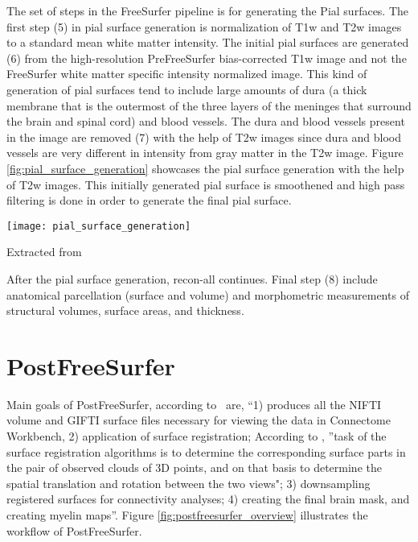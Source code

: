 The set of steps in the FreeSurfer pipeline is for generating the Pial surfaces. The first step (5) in pial surface generation is normalization of T1w and T2w images to a standard mean white matter intensity. The initial pial surfaces are generated (6) from the high-resolution PreFreeSurfer bias-corrected T1w image and not the FreeSurfer white matter specific intensity normalized image. This kind of generation of pial surfaces tend to include large amounts of dura (a thick membrane that is the outermost of the three layers of the meninges that surround the brain and spinal cord) and blood vessels. The dura and blood vessels present in the image are removed (7) with the help of T2w images since dura and blood vessels are very different in intensity from gray matter in the T2w image. Figure \ref{fig:pial_surface_generation} showcases the pial surface generation with the help of T2w images. This initially generated pial surface is smoothened and high pass filtering is done in order to generate the final pial surface.

\begin{center}
  \texttt{[image: pial\_surface\_generation]}
  \label{fig:pial_surface_generation}
  \caption*{Extracted from \cite{Gla13}}
\end{center}

After the pial surface generation, recon-all continues. Final step (8) include anatomical parcellation (surface and volume) and morphometric measurements of structural volumes, surface areas, and thickness.

\section{PostFreeSurfer} \label{sec:PostFreeSurfer}
Main goals of PostFreeSurfer, according to~\cite{Gla13} are, ``1) produces all the NIFTI volume and GIFTI surface files necessary for viewing the data in Connectome Workbench, 2) application of surface registration; According to \cite{DBLP:journals/corr/HrgeticP13}, ''task of the surface registration algorithms is to determine the corresponding surface parts in the pair of observed clouds of 3D points, and on that basis to determine the spatial translation and rotation between the two views"; 3) downsampling registered surfaces for connectivity analyses; 4) creating the final brain mask, and creating myelin maps''. Figure \ref{fig:postfreesurfer_overview} illustrates the workflow of PostFreeSurfer.\\

